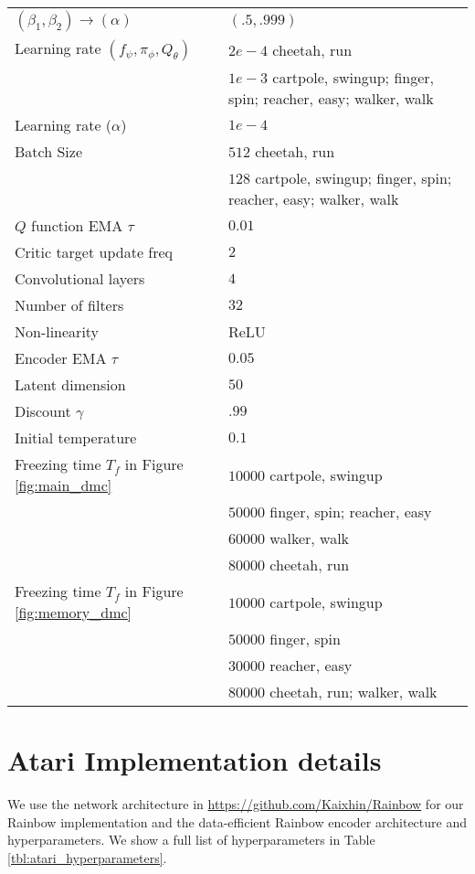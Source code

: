 \documentclass{article}
\begin{document}
\begin{table*}[ht]
\begin{center}
\begin{small}
\begin{tabular}{ll}
$(\beta_1,\beta_2) \rightarrow (\alpha)$   & $(.5,.999)$  \\
Learning rate $(f_\psi, \pi_\phi, Q_\theta)$ & $2e-4$ cheetah, run \\ 
& $1e-3$ cartpole, swingup; finger, spin; reacher, easy; walker, walk \\
Learning rate ($\alpha$) & $1e-4$ \\
Batch Size    & $512$ cheetah, run \\
& $128$ cartpole, swingup; finger, spin; reacher, easy; walker, walk \\
$Q$ function EMA $\tau$ & $0.01$ \\
Critic target update freq & $2$ \\
Convolutional layers & $4$ \\
Number of filters & $32$ \\
Non-linearity & ReLU \\
Encoder EMA $\tau$ & $0.05$ \\
Latent dimension & $50$ \\
Discount $\gamma$ & $.99$ \\
Initial temperature & $0.1$ \\
Freezing time $T_f$ in Figure \ref{fig:main_dmc} 
 & $10000$ cartpole, swingup \\
 & $50000$ finger, spin; reacher, easy \\
 & $60000$ walker, walk  \\
 & $80000$ cheetah, run \\
Freezing time $T_f$ in Figure \ref{fig:memory_dmc} 
 & $10000$ cartpole, swingup \\
 & $50000$ finger, spin \\
 & $30000$ reacher, easy  \\
 & $80000$ cheetah, run; walker, walk  \\
\bottomrule
\end{tabular}
\end{small}
\label{tbl:dmc_hyperparameters}
\end{center}
\vskip -0.1in
\end{table*} 

\section{Atari Implementation details} \label{appendix:atari_implementation_details}
We use the network architecture in \url{https://github.com/Kaixhin/Rainbow} for our Rainbow \citep{hessel2018rainbow} implementation and the data-efficient Rainbow \citep{van2019use} encoder architecture and hyperparameters. We show a full list of hyperparameters in Table \ref{tbl:atari_hyperparameters}. 
\end{document}
